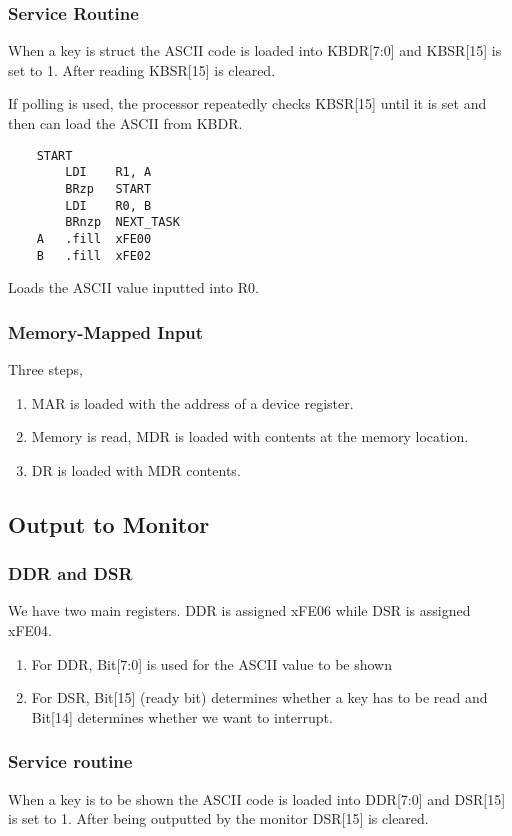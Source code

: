 \subsubsection{Service Routine}
When a key is struct the ASCII code is loaded into KBDR[7:0] and KBSR[15] is set to 1. After reading KBSR[15] is cleared.

If polling is used, the processor repeatedly checks KBSR[15] until it is set and then can load the ASCII from KBDR.

\begin{verbatim}
    START
        LDI    R1, A
        BRzp   START
        LDI    R0, B
        BRnzp  NEXT_TASK
    A   .fill  xFE00
    B   .fill  xFE02
\end{verbatim}

Loads the ASCII value inputted into R0.

\subsubsection{Memory-Mapped Input}
Three steps, 
\begin{enumerate}
    \item MAR is loaded with the address of a device register.
    \item Memory is read, MDR is loaded with contents at the memory location.
    \item DR is loaded with MDR contents.
\end{enumerate}

\subsection{Output to Monitor}
\subsubsection{DDR and DSR}
We have two main registers. DDR is assigned xFE06 while DSR is assigned xFE04. 

\begin{enumerate}
    \item  For DDR, Bit[7:0] is used for the ASCII value to be shown
\item  For DSR, Bit[15] (ready bit) determines whether a key has to be read and Bit[14] determines whether we want to interrupt.
\end{enumerate}

\subsubsection{Service routine}
When a key is to be shown the ASCII code is loaded into DDR[7:0] and DSR[15] is set to 1. After being outputted by the monitor DSR[15] is cleared.

